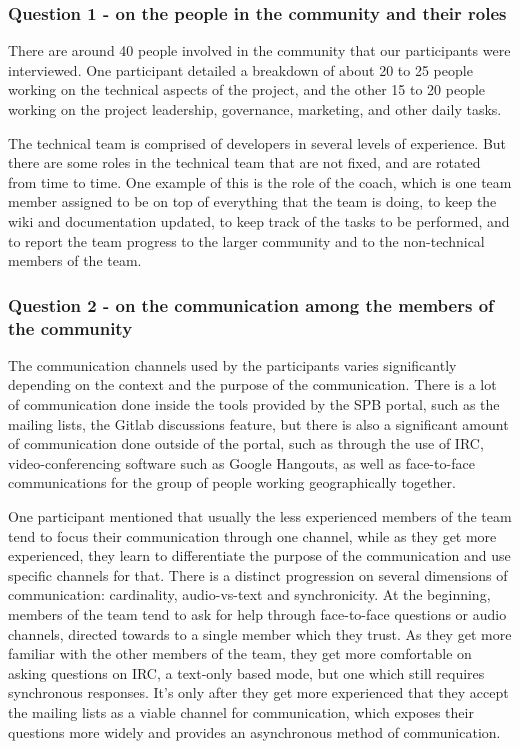 \documentclass{sigchi}
\begin{document}
\subsubsection{Question 1 - on the people in the community and their roles}

There are around 40 people involved in the community that our participants were interviewed. One participant detailed a breakdown of about 20 to 25 people working on the technical aspects of the project, and the other 15 to 20 people working on the project leadership, governance, marketing, and other daily tasks.

The technical team is comprised of developers in several levels of experience. But there are some roles in the technical team that are not fixed, and are rotated from time to time. One example of this is the role of the coach, which is one team member assigned to be on top of everything that the team is doing, to keep the wiki and documentation updated, to keep track of the tasks to be performed, and to report the team progress to the larger community and to the non-technical members of the team.


\subsubsection{Question 2 - on the communication among the members of the community}
The communication channels used by the participants varies significantly depending on the context and the purpose of the communication. There is a lot of communication done inside the tools provided by the SPB portal, such as the mailing lists, the Gitlab discussions feature, but there is also a significant amount of communication done outside of the portal, such as through the use of IRC, video-conferencing software such as Google Hangouts, as well as face-to-face communications for the group of people working geographically together.

One participant mentioned that usually the less experienced members of the team tend to focus their communication through one channel, while as they get more experienced, they learn to differentiate the purpose of the communication and use specific channels for that. There is a distinct progression on several dimensions of communication: cardinality, audio-vs-text and synchronicity. At the beginning, members of the team tend to ask for help through face-to-face questions or audio channels, directed towards to a single member which they trust. As they get more familiar with the other members of the team, they get more comfortable on asking questions on IRC, a text-only based mode, but one which still requires synchronous responses. It's only after they get more experienced that they accept the mailing lists as a viable channel for communication, which exposes their questions more widely and provides an asynchronous method of communication.
\end{document}

